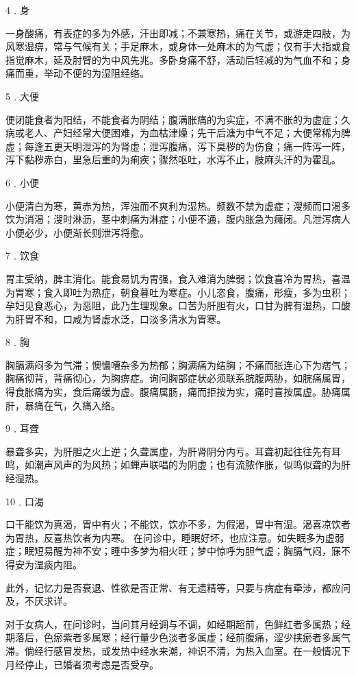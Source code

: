 \documentclass[a4paper,12pt,UTF8,twoside]{ctexbook}
\begin{document}
4﹒身

一身酸痛，有表症的多为外感，汗出即减；不兼寒热，痛在关节，或游走四肢，为风寒湿痹，常与气候有关；手足麻木，或身体一处麻木的为气虚；仅有手大指或食指觉麻木，延及肘臂的为中风先兆。多卧身痛不舒，活动后轻减的为气血不和；身痛而重，举动不便的为湿阻经络。

5﹒大便

便闭能食者为阳结，不能食者为阴结；腹满胀痛的为实症，不满不胀的为虚症；久病或老人、产妇经常大便困难，为血枯津燥；先干后溏为中气不足；大便常稀为脾虚；每逢五更天明泄泻的为肾虚；泄泻腹痛，泻下臭秽的为伤食；痛一阵泻一阵，泻下黏秽赤白，里急后重的为痢疾；骤然呕吐，水泻不止，肢麻头汗的为霍乱。

6﹒小便

小便清白为寒，黄赤为热，浑浊而不爽利为湿热。频数不禁为虚症；溲频而口渴多饮为消渴；溲时淋沥，茎中刺痛为淋症；小便不通，腹内胀急为癃闭。凡泄泻病人小便必少，小便渐长则泄泻将愈。

7﹒饮食

胃主受纳，脾主消化。能食易饥为胃强，食入难消为脾弱；饮食喜冷为胃热，喜温为胃寒；食入即吐为热症，朝食暮吐为寒症。小儿恣食，腹痛，形瘦，多为虫积；孕妇见食恶心，为恶阻，此乃生理现象。口苦为肝胆有火，口甘为脾有湿热，口酸为肝胃不和，口咸为肾虚水泛，口淡多清水为胃寒。

8﹒胸

胸膈满闷多为气滞；懊憹嘈杂多为热郁；胸满痛为结胸；不痛而胀连心下为痞气；胸痛彻背，背痛彻心，为胸痹症。询问胸部症状必须联系脘腹两胁，如脘痛属胃，得食胀痛为实，食后痛缓为虚。腹痛属肠，痛而拒按为实，痛时喜按属虚。胁痛属肝，暴痛在气，久痛入络。

9﹒耳聋

暴聋多实，为肝胆之火上逆；久聋属虚，为肝肾阴分内亏。耳聋初起往往先有耳鸣，如潮声风声的为风热；如蝉声联唱的为阴虚；也有流脓作胀，似鸣似聋的为肝经湿热。

10﹒口渴

口干能饮为真渴，胃中有火；不能饮，饮亦不多，为假渴，胃中有湿。渴喜凉饮者为胃热，反喜热饮者为内寒。
在问诊中，睡眠好坏，也应注意。如失眠多为虚弱症；眠短易醒为神不安；睡中多梦为相火旺；梦中惊呼为胆气虚；胸膈气闷，寐不得安为湿痰内阻。

此外，记忆力是否衰退、性欲是否正常、有无遗精等，只要与病症有牵涉，都应问及，不厌求详。

对于女病人，在问诊时，当问其月经调与不调，如经期超前，色鲜红者多属热；经期落后，色瘀紫者多属寒；经行量少色淡者多属虚；经前腹痛，涩少挟瘀者多属气滞。倘经行感冒发热，或发热中经水来潮，神识不清，为热入血室。在一般情况下月经停止，已婚者须考虑是否受孕。
\end{document}
